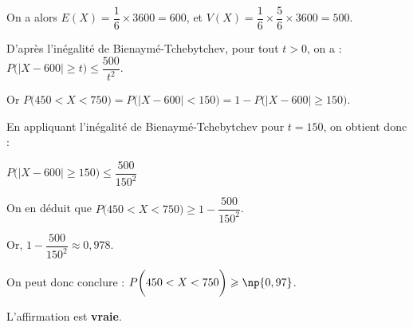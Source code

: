 \begin{enumerate}
		On a alors \quad $E(X)=\dfrac16 \times 3600 = 600$, \quad et \quad $V(X)=\dfrac16 \times \dfrac56 \times 3600=500$.

		D'après l'inégalité de Bienaymé-Tchebytchev, pour tout $t >0$, on a :\quad $P \bigg( \big\vert X-600 \big\vert \geqslant t \bigg) \leqslant \dfrac{500}{t^2}$.

		Or \quad $P \bigg( 450 < X < 750 \bigg) = P \bigg( \big\vert X-600 \big\vert < 150 \bigg) =1- P \bigg( \big\vert X-600 \big\vert \geqslant 150 \bigg)$.

		En appliquant l'inégalité de Bienaymé-Tchebytchev pour $t=150$, on obtient donc :

		$P \bigg( \big\vert X-600 \big\vert \geqslant 150 \bigg) \leqslant \dfrac{500}{150^2}$

		On en déduit que \quad $P \bigg( 450 < X < 750 \bigg)  \geqslant 1-\dfrac{500}{150^2}$.

		Or, \quad $1-\dfrac{500}{150^2} \approx 0,978$.

		On peut donc conclure : \quad $P \bigg( 450 < X < 750 \bigg) \geqslant \np{0,97}$.

		L'affirmation est \textbf{vraie}.
	\end{enumerate}

